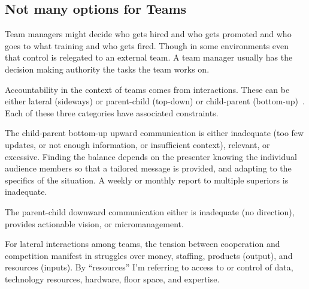 \subsection*{Not many options for Teams}

Team managers might decide who gets hired and who gets promoted and who goes to what training and who gets fired. Though in some environments even that control is relegated to an external team. A team manager usually has the decision making authority the tasks the team works on. 

Accountability in the context of teams comes from interactions. These can be either lateral (sideways) or parent-child (top-down) or child-parent (bottom-up)~\cite{2014_Jorgensen}. Each of these three categories have associated constraints.

The child-parent bottom-up upward communication is either inadequate (too few updates, or not enough information, or insufficient context), relevant, or excessive. Finding the balance depends on the presenter knowing the individual audience members so that a tailored message is provided, and adapting to the specifics of the situation. A weekly or monthly report to multiple superiors is inadequate. 

The parent-child downward communication either is inadequate (no direction), provides actionable vision, or micromanagement. 

For lateral interactions among teams, the tension between cooperation and competition manifest in struggles over money, staffing, products (output), and resources (inputs). By ``resources'' I'm referring to access to or control of data, technology resources, hardware, floor space, and expertise. 


